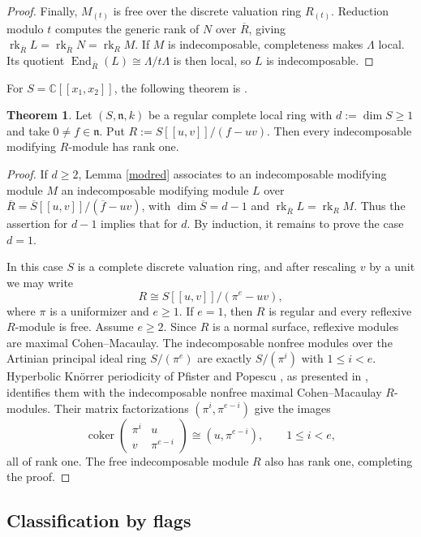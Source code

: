 \documentclass[a4paper,reqno]{amsart}
\def\n{\mathfrak{n}}
\def\La{\Lambda}
\DeclareMathOperator{\End}{End}
\DeclareMathOperator{\rk}{rk}
\theoremstyle{definition}
\newtheorem{Thm}{Theorem}[section]
\begin{document}
\begin{proof}
Finally, $M_{(t)}$ is free over the discrete valuation ring $R_{(t)}$. Reduction modulo $t$ computes the generic rank of $N$ over $\overline R$, giving $\rk_{\overline R}L=\rk_{\overline R}N=\rk_RM$. If $M$ is indecomposable, completeness makes $\La$ local. Its quotient $\End_{\overline R}(L)\cong\La/t\La$ is then local, so $L$ is indecomposable.
\end{proof}

For $S=\mathbb C[[x_1,x_2]]$, the following theorem is \cite[Proposition 5.24]{IW18}.

\begin{Thm}\label{modrk1}
Let $(S,\n,k)$ be a regular complete local ring with $d:=\dim S\ge1$ and take $0\ne f\in\n$. Put $R:=S[[u,v]]/(f-uv)$. Then every indecomposable modifying $R$-module has rank one.
\end{Thm}
\begin{proof}
If $d\ge2$, Lemma \ref{modred} associates to an indecomposable modifying module $M$ an indecomposable modifying module $L$ over $\overline R=\overline S[[u,v]]/(\overline f-uv)$, with $\dim\overline S=d-1$ and $\rk_{\overline R}L=\rk_RM$. Thus the assertion for $d-1$ implies that for $d$. By induction, it remains to prove the case $d=1$.

In this case $S$ is a complete discrete valuation ring, and after rescaling $v$ by a unit we may write
\[
R\cong S[[u,v]]/(\pi^e-uv),
\]
where $\pi$ is a uniformizer and $e\ge1$. If $e=1$, then $R$ is regular and every reflexive $R$-module is free. Assume $e\ge2$. Since $R$ is a normal surface, reflexive modules are maximal Cohen--Macaulay. The indecomposable nonfree modules over the Artinian principal ideal ring $S/(\pi^e)$ are exactly $S/(\pi^i)$ with $1\le i<e$. Hyperbolic Kn\"orrer periodicity of Pfister and Popescu \cite[Theorem 3.12]{PP96}, as presented in \cite[Theorem 2.4 and Corollary 2.6]{Leu26}, identifies them with the indecomposable nonfree maximal Cohen--Macaulay $R$-modules. Their matrix factorizations $(\pi^i,\pi^{e-i})$ give the images
\[
\operatorname{coker}\begin{pmatrix}\pi^i&u\\v&\pi^{e-i}\end{pmatrix}
\cong(u,\pi^{e-i}),
\qquad 1\le i<e,
\]
all of rank one. The free indecomposable module $R$ also has rank one, completing the proof.
\end{proof}

\subsection{Classification by flags}\label{sec:modifying-classification}
\end{document}
